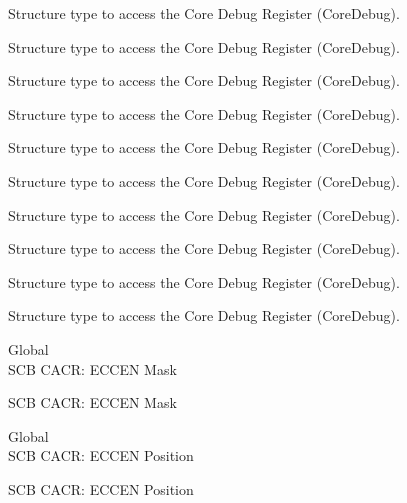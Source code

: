 \begin{DoxyRefList}
\label{deprecated__deprecated000455}%
%
Structure type to access the Core Debug Register (Core\+Debug). 

\label{deprecated__deprecated000557}%
%
Structure type to access the Core Debug Register (Core\+Debug). 

\label{deprecated__deprecated000682}%
%
Structure type to access the Core Debug Register (Core\+Debug). 

\label{deprecated__deprecated000782}%
%
Structure type to access the Core Debug Register (Core\+Debug). 

\label{deprecated__deprecated000836}%
%
Structure type to access the Core Debug Register (Core\+Debug). 

\label{deprecated__deprecated000921}%
%
Structure type to access the Core Debug Register (Core\+Debug). 

\label{deprecated__deprecated000978}%
%
Structure type to access the Core Debug Register (Core\+Debug). 

\label{deprecated__deprecated001054}%
%
Structure type to access the Core Debug Register (Core\+Debug). 

\label{deprecated__deprecated001133}%
%
Structure type to access the Core Debug Register (Core\+Debug). 

\label{deprecated__deprecated001235}%
%
Structure type to access the Core Debug Register (Core\+Debug).  
\item[Global \doxylink{group___c_m_s_i_s___s_c_b_ga7456a0b93710e8b9fa2b94c946e96c5c}{SCB\+\_\+\+CACR\+\_\+\+ECCEN\+\_\+\+Msk} ]\hfill \\
\label{deprecated__deprecated000556}%
%
SCB CACR\+: ECCEN Mask 

\label{deprecated__deprecated001234}%
%
SCB CACR\+: ECCEN Mask  
\item[Global \doxylink{group___c_m_s_i_s___s_c_b_ga76ce5adcbed2d2d8d425214a1e5d0579}{SCB\+\_\+\+CACR\+\_\+\+ECCEN\+\_\+\+Pos} ]\hfill \\
\label{deprecated__deprecated000555}%
%
SCB CACR\+: ECCEN Position 

\label{deprecated__deprecated001233}%
%
SCB CACR\+: ECCEN Position 
\end{DoxyRefList}